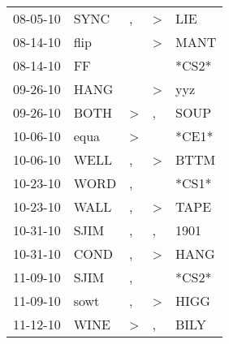 \begin{supertabular}{p{0.07\textwidth}p{0.06\textwidth}p{0.02\textwidth}p{0.02\textwidth}p{0.06\textwidth}}
          08-05-10\textsuperscript{} &           SYNC\textsuperscript{} &                , &     \textgreater &            LIE\textsuperscript{} \\
          08-14-10\textsuperscript{} &           flip\textsuperscript{} &                  &     \textgreater &           MANT\textsuperscript{} \\
          08-14-10\textsuperscript{} &             FF\textsuperscript{} &                  &                  &                            *CS2* \\
          09-26-10\textsuperscript{} &           HANG\textsuperscript{} &                  &     \textgreater &            yyz\textsuperscript{} \\
          09-26-10\textsuperscript{} &           BOTH\textsuperscript{} &     \textgreater &                , &           SOUP\textsuperscript{} \\
          10-06-10\textsuperscript{} &           equa\textsuperscript{} &     \textgreater &                  &                            *CE1* \\
          10-06-10\textsuperscript{} &           WELL\textsuperscript{} &                , &     \textgreater &           BTTM\textsuperscript{} \\
          10-23-10\textsuperscript{} &           WORD\textsuperscript{} &                , &                  &                            *CS1* \\
          10-23-10\textsuperscript{} &           WALL\textsuperscript{} &                , &     \textgreater &           TAPE\textsuperscript{} \\
          10-31-10\textsuperscript{} &           SJIM\textsuperscript{} &                , &                , &           1901\textsuperscript{} \\
          10-31-10\textsuperscript{} &           COND\textsuperscript{} &                , &     \textgreater &           HANG\textsuperscript{} \\
          11-09-10\textsuperscript{} &           SJIM\textsuperscript{} &                , &                  &                            *CS2* \\
          11-09-10\textsuperscript{} &           sowt\textsuperscript{} &                , &     \textgreater &           HIGG\textsuperscript{} \\
          11-12-10\textsuperscript{} &           WINE\textsuperscript{} &     \textgreater &                , &           BILY\textsuperscript{} \\

\end{supertabular}

